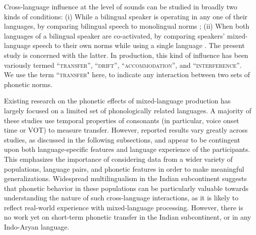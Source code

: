 \documentclass[12 pt]{article}
\begin{document}
Cross-language influence at the level of sounds can be studied in broadly two kinds of conditions:
(i) While a bilingual speaker is operating in any one of their languages, by comparing bilingual speech to monolingual norms \citep[e.g.][]{guion2003vowel,caramazza1973acquisition,flege1987production}; %
(ii) When both languages of a bilingual speaker are co-activated, by comparing speakers' mixed-language speech to their own norms while using a single language \citep[e.g.][]{grosjean1994going, bullock2009trying,elias2017effects, simonet2014phonetic}. %
The present study is concerned with the latter. In production, this kind of influence has been variously termed \textsc{``transfer'', ``drift'', ``accommodation'',} and \textsc{``interference''}. We use the term \textsc{``transfer"} here, to indicate any interaction between two sets of phonetic norms.

Existing research on the phonetic effects of mixed-language production has largely focused on a limited set of phonologically related languages. A majority of these studies use temporal properties of consonants (in particular, voice onset time or VOT) to measure transfer. However, reported results vary greatly across studies, as discussed in the following subsections, and appear to be contingent upon both language-specific features and language experience of the participants. This emphasizes the importance of considering data from a wider variety of
populations, language pairs,  and phonetic features in order to make meaningful generalizations. Widespread multilingualism in the Indian subcontinent suggests that phonetic  behavior in these populations can be particularly valuable towards understanding the nature of such cross-language interactions, as it is likely to reflect real-world experience with mixed-language processing. However, there is no work yet on short-term phonetic transfer in the Indian subcontinent, or in any Indo-Aryan language. 
\end{document}
